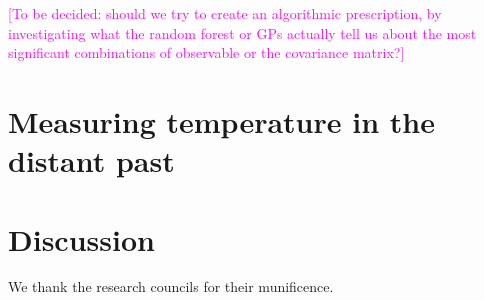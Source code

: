 \documentclass[rmp,aps,twocolumn]{revtex4-1}
\newcommand{\ilya}[1]{\textcolor{magenta}{#1}}
\begin{document}
\ilya{[To be decided: should we try to create an algorithmic prescription, by investigating what the random forest or GPs actually tell us about the most significant combinations of observable or the covariance matrix?]} 


\section{Measuring temperature in the distant past}



\section{Discussion}\label{sec:discussion}

\begin{acknowledgements}
We thank the research councils for their munificence.

\end{acknowledgements}



\end{document}
